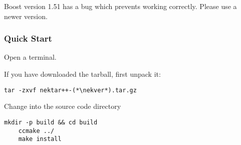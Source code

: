 \begin{warningbox}
Boost version 1.51 has a bug which prevents \nekpp working correctly.
Please use a newer version.
\end{warningbox}


\subsubsection{Quick Start}
Open a terminal.

If you have downloaded the tarball, first unpack it:
\begin{lstlisting}[style=BashInputStyle]
tar -zxvf nektar++-(*\nekver*).tar.gz
\end{lstlisting}
Change into the  source code directory
\begin{lstlisting}[style=BashInputStyle]
    mkdir -p build && cd build
    ccmake ../
    make install
\end{lstlisting}

